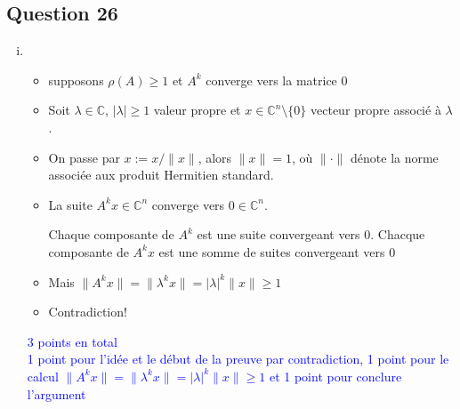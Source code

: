 \documentclass[11pt, a4paper, oneside]{article}
\newcommand{\indice}[1]{{\scriptsize \color{RubineRed} {#1}}}
\begin{document}
\subsection*{Question 26}
\begin{enumerate}[i)]
\item
  \begin{itemize}
  \item supposons $\rho(A) \geq 1$ et $A^k$ converge vers la matrice $0$
  \item Soit  $\lambda ∈ℂ$, $|λ|≥1$  valeur propre et  $x \in \mathbb{C}^n \setminus \{0\}$ vecteur propre  associé à $\lambda$.
  \item On passe par $x := x / \|x\|$, alors $\|x\| = 1$, où $\| \cdot\|$
    dénote la norme associée aux produit Hermitien standard.    
  \item La suite  $A^k x ∈ ℂ^n$ converge vers $0 ∈ ℂ^n$.
    
    \indice{Chaque composante de $A^k$ est une suite convergeant vers $0$. Chacque composante de $A^k x$ est une somme de suites convergeant vers $0$} 
  \item Mais $\|A^k x\|  = \|λ^k x\|  = |λ|^k \|x\| ≥ 1$
  \item Contradiction! 
  \end{itemize}
\textcolor{blue}{3 points en total \\ 1 point pour l'idée et le début de la preuve par contradiction, 1 point pour le calcul  $\|A^k x\|  = \|λ^k x\|  = |λ|^k \|x\| ≥ 1$  et 1 point pour conclure l'argument} 


\end{enumerate}
\end{document}
